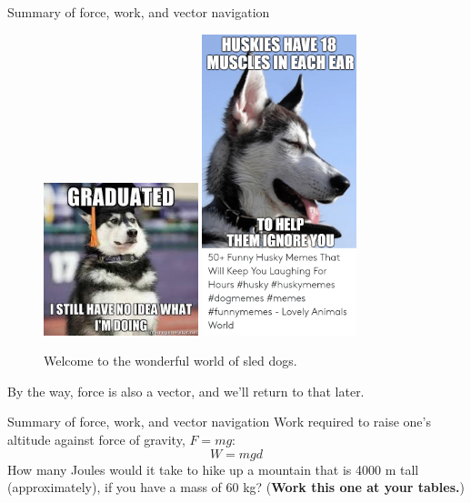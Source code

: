 \documentclass{beamer}
\begin{document}
\begin{frame}{Summary of force, work, and vector navigation}
\begin{figure}
\centering
\includegraphics[width=0.4\textwidth]{husky1.jpeg}
\includegraphics[width=0.4\textwidth,trim=0cm 10cm 0cm 0cm,clip=true]{husky2.png}
\caption{\label{fig:dogs} Welcome to the wonderful world of sled dogs.}
\end{figure}
By the way, force is also a vector, and we'll return to that later.
\end{frame}

\begin{frame}{Summary of force, work, and vector navigation}
Work required to raise one's altitude against force of gravity, $F = mg$:
\begin{equation}
W = m g d
\end{equation}
How many Joules would it take to hike up a mountain that is 4000 m tall (approximately), if you have a mass of 60 kg?  (\textbf{Work this one at your tables.})
\end{frame}
\end{document}
